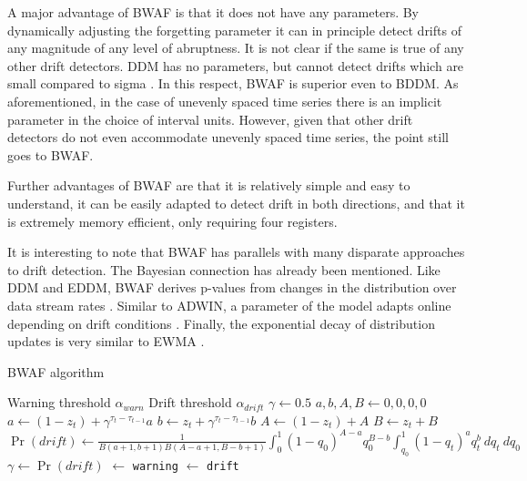 A major advantage of BWAF is that it does not have any parameters. By dynamically adjusting the forgetting parameter it can in principle detect drifts of any magnitude of any level of abruptness. It is not clear if the same is true of any other drift detectors. DDM has no parameters, but cannot detect drifts which are small compared to sigma \cite{DDM}. In this respect, BWAF is superior even to BDDM. As aforementioned, in the case of unevenly spaced time series there is an implicit parameter in the choice of interval units. However, given that other drift detectors do not even accommodate unevenly spaced time series, the point still goes to BWAF. 

Further advantages of BWAF are that it is relatively simple and easy to understand, it can be easily adapted to detect drift in both directions, and that it is extremely memory efficient, only requiring four registers. 

It is interesting to note that BWAF has parallels with many disparate approaches to drift detection. The Bayesian connection has already been mentioned. Like DDM and EDDM, BWAF derives p-values from changes in the distribution over data stream rates \cite{DDM}\cite{EDDM}. Similar to ADWIN, a parameter of the model adapts online depending on drift conditions \cite{ADWIN}. Finally, the exponential decay of distribution updates is very similar to EWMA \cite{EWMA}. 

\begin{algorithm}
    \caption{BWAF algorithm}
    \label{alg:bwaf}
    \begin{algorithmic}
        \Require Warning threshold $\alpha_{warn}$
        \Require Drift threshold $\alpha_{drift}$
        \State $\gamma \gets 0.5$
        \State $a,b,A,B \gets 0,0,0,0$
          \State $a \gets (1-z_t) + \gamma^{\tau_t-\tau_{t-1}} a$
          \State $b \gets z_t + \gamma^{\tau_t-\tau_{t-1}} b$
          \State $A \gets (1-z_t) + A$
          \State $B \gets z_t + B$
          \State $\Pr(drift) \gets \frac{1}{B(a+1,b+1)B(A-a+1,B-b+1)}\int_0^1 (1-q_0)^{A-a}q_0^{B-b} \int_{q_0}^1 (1-q_t)^aq_t^b ~dq_t ~ dq_0$
          \State $\gamma \gets \Pr(drift)$
             $\gets$ {\tt warning}
             $\gets$ {\tt drift}
          \EndIf
        \EndFor
    \end{algorithmic}
\end{algorithm}

